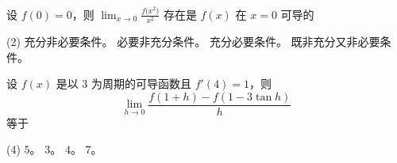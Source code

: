 \begin{ti}
	设 $f(0) = 0$，则 $\lim_{x \to 0} \frac{f\bigl(x^2\bigr)}{x^2}$ 存在是 $f(x)$ 在 $x=0$ 可导的
	\begin{tasks}(2)
		\task 充分非必要条件。
		\task 必要非充分条件。
		\task 充分必要条件。
		\task 既非充分又非必要条件。
	\end{tasks}
\end{ti}

\begin{ti}
	设 $f(x)$ 是以 $3$ 为周期的可导函数且 $f'(4) = 1$，则
	\[\lim_{h \to 0} \frac{f(1+h) - f(1-3\tan h)}{h}\]
	等于
	\begin{tasks}(4)
		\task $5$。
		\task $3$。
		\task $4$。
		\task $7$。
	\end{tasks}
\end{ti}